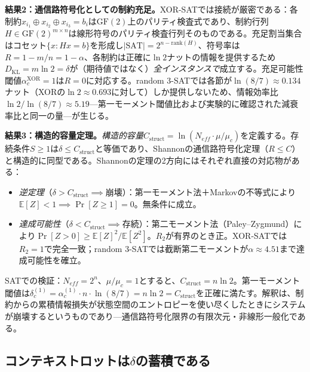 \documentclass[11pt,a4paper]{article}
\begin{document}
\textbf{結果2：通信路符号化としての制約充足。}XOR-SATでは接続が厳密である：各制約$x_{i_1} \oplus x_{i_2} \oplus x_{i_3} = b_i$は$\text{GF}(2)$上のパリティ検査式であり、制約行列$H \in \text{GF}(2)^{m \times n}$は線形符号のパリティ検査行列そのものである。充足割当集合はコセット$\{x : Hx = b\}$を形成し$|\text{SAT}| = 2^{n - \text{rank}(H)}$、符号率は$R = 1 - m/n = 1 - \alpha$、各制約は正確に$\ln 2$ナットの情報を提供するため$D_{\text{KL}} = m \ln 2 = \delta$が（期待値ではなく）\emph{全インスタンスで}成立する。充足可能性閾値$\alpha_c^{\text{XOR}} = 1$は$R = 0$に対応する。random 3-SATでは各節が$\ln(8/7) \approx 0.134$ナット（XORの$\ln 2 \approx 0.693$に対して）しか提供しないため、情報効率比$\ln 2 / \ln(8/7) \approx 5.19$---第一モーメント閾値比および実験的に確認された減衰率比と同一の量---が生じる。

\textbf{結果3：構造的容量定理。}\emph{構造的容量}$C_{\text{struct}} = \ln(N_{eff} \cdot \mu/\mu_c)$を定義する。存続条件$S \geq 1$は$\delta \leq C_{\text{struct}}$と等価であり、Shannonの通信路符号化定理（$R \leq C$）と構造的に同型である。Shannonの定理の2方向にはそれぞれ直接の対応物がある：

\begin{itemize}
    \item \emph{逆定理}（$\delta > C_{\text{struct}} \implies$崩壊）：第一モーメント法＋Markovの不等式により$\mathbb{E}[Z] < 1 \implies \Pr[Z \geq 1] = 0$。無条件に成立。

    \item \emph{達成可能性}（$\delta < C_{\text{struct}} \implies$存続）：第二モーメント法（Paley--Zygmund）により$\Pr[Z > 0] \geq \mathbb{E}[Z]^2/\mathbb{E}[Z^2]$。$R_2$が有界のとき正。XOR-SATでは$R_2 = 1$で完全一致；random 3-SATでは截断第二モーメントが$\alpha \approx 4.51$まで達成可能性を確立。
\end{itemize}

\noindent SATでの検証：$N_{eff} = 2^n$、$\mu/\mu_c = 1$とすると、$C_{\text{struct}} = n \ln 2$。第一モーメント閾値は$\delta_c^{(1)} = \alpha_c^{(1)} \cdot n \cdot \ln(8/7) = n \ln 2 = C_{\text{struct}}$を正確に満たす。解釈は、制約からの累積情報損失が状態空間のエントロピーを使い尽くしたときにシステムが崩壊するというものであり---通信路符号化限界の有限次元・非線形一般化である。

\subsection{コンテキストロットは\texorpdfstring{$\delta$}{δ}の蓄積である}
\label{sec:context-rot}
\end{document}
